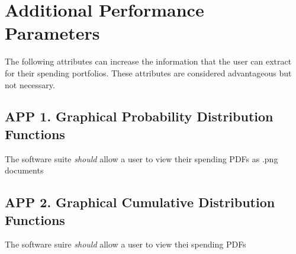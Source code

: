 \section{Additional Performance Parameters}
The following attributes can increase the information that the user can extract
for their spending portfolios.  These attributes are considered advantageous but
not necessary.

\subsection{APP 1. Graphical Probability Distribution Functions}
The software suite {\textit{should}} allow a user to view their spending 
PDFs as .png documents

\subsection{APP 2. Graphical Cumulative Distribution Functions}
The software suire {\textit{should}} allow a user to view thei spending PDFs
